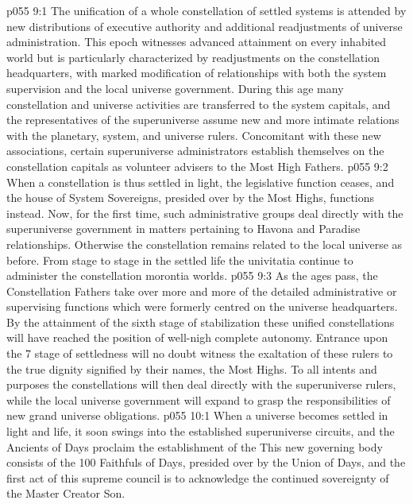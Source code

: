 \vs p055 9:1 The unification of a whole constellation of settled systems is attended by new distributions of executive authority and additional readjustments of universe administration. This epoch witnesses advanced attainment on every inhabited world but is particularly characterized by readjustments on the constellation headquarters, with marked modification of relationships with both the system supervision and the local universe government. During this age many constellation and universe activities are transferred to the system capitals, and the representatives of the superuniverse assume new and more intimate relations with the planetary, system, and universe rulers. Concomitant with these new associations, certain superuniverse administrators establish themselves on the constellation capitals as volunteer advisers to the Most High Fathers.
\vs p055 9:2 When a constellation is thus settled in light, the legislative function ceases, and the house of System Sovereigns, presided over by the Most Highs, functions instead. Now, for the first time, such administrative groups deal directly with the superuniverse government in matters pertaining to Havona and Paradise relationships. Otherwise the constellation remains related to the local universe as before. From stage to stage in the settled life the univitatia continue to administer the constellation morontia worlds.
\vs p055 9:3 As the ages pass, the Constellation Fathers take over more and more of the detailed administrative or supervising functions which were formerly centred on the universe headquarters. By the attainment of the sixth stage of stabilization these unified constellations will have reached the position of well\hyp{}nigh complete autonomy. Entrance upon the 7 stage of settledness will no doubt witness the exaltation of these rulers to the true dignity signified by their names, the Most Highs. To all intents and purposes the constellations will then deal directly with the superuniverse rulers, while the local universe government will expand to grasp the responsibilities of new grand universe obligations.
\vs p055 10:1 When a universe becomes settled in light and life, it soon swings into the established superuniverse circuits, and the Ancients of Days proclaim the establishment of the  This new governing body consists of the 100 Faithfuls of Days, presided over by the Union of Days, and the first act of this supreme council is to acknowledge the continued sovereignty of the Master Creator Son.
